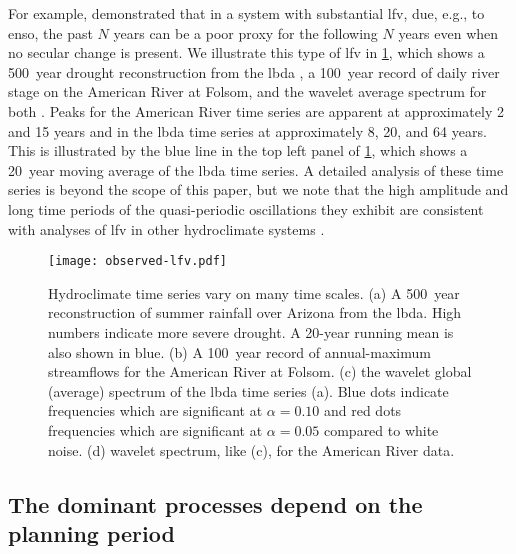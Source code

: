 \documentclass[
  draft,
  linenumbers
]{agujournal2018}
\makeatletter
\newcommand{\eg}{e.g.\@\xspace}
\makeatother
\begin{document}
For example, \citet{Jain:2001hz} demonstrated that in a system with substantial \acrfull{lfv}, due, \eg, to \gls{enso}, the past $N$ years can be a poor proxy for the following $N$ years even when no secular change is present.
We illustrate this type of \gls{lfv} in \cref{fig:observed-lfv}, which shows a \SI{500}{year} drought reconstruction from the \gls{lbda} \citep{Cook:2010bz}, a \SI{100}{year} record of daily river stage on the American River at Folsom, and the wavelet average spectrum for both \citep{Torrence:1998jp,Roesch:wlBQQoIs}.
Peaks for the American River time series are apparent at approximately 2 and 15 years and in the \gls{lbda} time series at approximately 8, 20, and 64 years.
This is illustrated by the blue line in the top left panel of \cref{fig:observed-lfv}, which shows a \SI{20}{year} moving average of the \gls{lbda} time series.
A detailed analysis of these time series is beyond the scope of this paper, but we note that the high amplitude and long time periods of the quasi-periodic oscillations they exhibit are consistent with analyses of \gls{lfv} in other hydroclimate systems \citep{Kiem:2002kq,Swierczynski:2012km,Woollings:2014kd,Hodgkins:2017hw}.

\begin{figure}
  \centering
  \texttt{[image: observed-lfv.pdf]}
  \caption{
    Hydroclimate time series vary on many time scales.
    (a) A \SI{500}{year} reconstruction of summer rainfall over Arizona from the \acrfull{lbda}.
    High numbers indicate more severe drought.
    A 20-year running mean is also shown in blue.
    (b) A \SI{100}{year} record of annual-maximum streamflows for the American River at Folsom.
    (c) the wavelet global (average) spectrum of the \gls{lbda} time series (a).
    Blue dots indicate frequencies which are significant at $\alpha=0.10$ and red dots frequencies which are significant at $\alpha=0.05$ compared to white noise.
    (d) wavelet spectrum, like (c), for the American River data.
  }\label{fig:observed-lfv}
\end{figure}


\subsection{The dominant processes depend on the planning period}\label{sec:intro-dominant}
\end{document}
